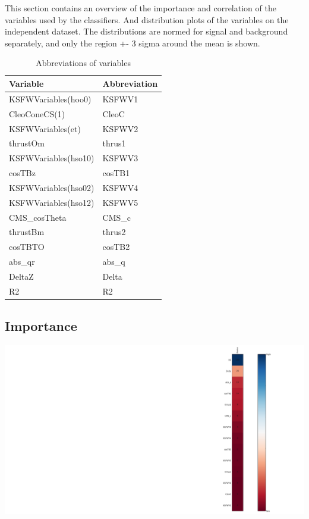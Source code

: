\documentclass[10pt,a4paper]{article}
\begin{document}
            This section contains an overview of the importance and correlation of the variables used by the classifiers.
            And distribution plots of the variables on the independent dataset. The distributions are normed for signal and
            background separately, and only the region +- 3 sigma around the mean is shown.
        \begin{center}
\begin{longtable}{ll}
\caption{Abbreviations of variables}\\
\toprule
Variable & Abbreviation\\
\midrule
KSFWVariables(hoo0) & KSFWV1\\
CleoConeCS(1) & CleoC\\
KSFWVariables(et) & KSFWV2\\
thrustOm & thrus1\\
KSFWVariables(hso10) & KSFWV3\\
cosTBz & cosTB1\\
KSFWVariables(hso02) & KSFWV4\\
KSFWVariables(hso12) & KSFWV5\\
CMS\_cosTheta & CMS\_c\\
thrustBm & thrus2\\
cosTBTO & cosTB2\\
abs\_qr & abs\_q\\
DeltaZ & Delta\\
R2 & R2\\
\bottomrule
\end{longtable}
\end{center}
\subsection{Importance}
\begin{center}
\includegraphics[width=1.0\textwidth]{importance.pdf}
\end{center}
\end{document}
